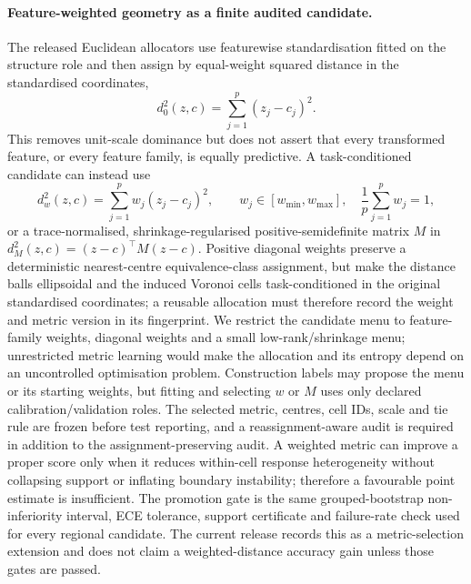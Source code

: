 \documentclass[11pt,a4paper]{article}
\numberwithin{equation}{section}
\theoremstyle{definition}\newtheorem{definition}[theorem]{Definition}
\theoremstyle{remark}\newtheorem{remark}[theorem]{Remark}
\begin{document}
\paragraph{Feature-weighted geometry as a finite audited candidate.}
The released Euclidean allocators use featurewise standardisation fitted on
the structure role and then assign by equal-weight squared distance in the
standardised coordinates,
\[
d_0^2(z,c)=\sum_{j=1}^{p}(z_j-c_j)^2 .
\]
This removes unit-scale dominance but does not assert that every transformed
feature, or every feature family, is equally predictive. A task-conditioned
candidate can instead use
\[
d_w^2(z,c)=\sum_{j=1}^{p}w_j(z_j-c_j)^2,\qquad
w_j\in[w_{\min},w_{\max}],\quad \frac1p\sum_{j=1}^{p}w_j=1,
\]
or a trace-normalised, shrinkage-regularised positive-semidefinite matrix
$M$ in $d_M^2(z,c)=(z-c)^\top M(z-c)$. Positive diagonal weights preserve a
deterministic nearest-centre equivalence-class assignment, but make the distance balls ellipsoidal and the induced Voronoi cells
task-conditioned in the original standardised coordinates; a
reusable allocation must therefore record the weight and metric version in its
fingerprint. We restrict the candidate menu to
feature-family weights, diagonal weights and a small low-rank/shrinkage menu;
unrestricted metric learning would make the allocation and its entropy depend
on an uncontrolled optimisation problem. Construction labels may propose the
menu or its starting weights, but fitting and selecting $w$ or $M$ uses only
declared calibration/validation roles. The selected metric, centres, cell IDs,
scale and tie rule are frozen before test reporting, and a reassignment-aware
audit is required in addition to the assignment-preserving audit. A weighted
metric can improve a proper score only when it reduces within-cell response
heterogeneity without collapsing support or inflating boundary instability;
therefore a favourable point estimate is insufficient. The promotion gate is
the same grouped-bootstrap non-inferiority interval, ECE tolerance, support
certificate and failure-rate check used for every regional candidate. The
current release records this as a metric-selection extension and does not
claim a weighted-distance accuracy gain unless those gates are passed.
\end{document}
